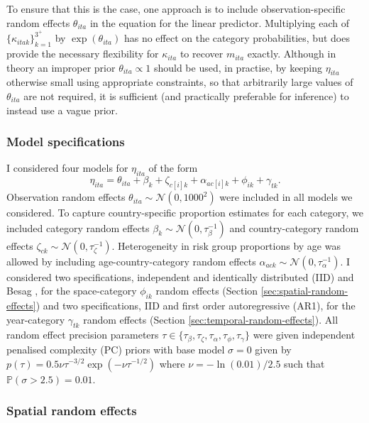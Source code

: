 \documentclass[a4paper, nobind]{templates/ociamthesis}
\begin{document}
To ensure that this is the case, one approach is to include observation-specific random effects \(\theta_{ita}\) in the equation for the linear predictor.
Multiplying each of \(\{\kappa_{itak}\}_{k = 1}^{3^+}\) by \(\exp(\theta_{ita})\) has no effect on the category probabilities, but does provide the necessary flexibility for \(\kappa_{ita}\) to recover \(m_{ita}\) exactly.
Although in theory an improper prior \(\theta_{ita} \propto 1\) should be used, in practise, by keeping \(\eta_{ita}\) otherwise small using appropriate constraints, so that arbitrarily large values of \(\theta_{ita}\) are not required, it is sufficient (and practically preferable for inference) to instead use a vague prior.

\hypertarget{model-specifications}{%
\subsubsection{Model specifications}\label{model-specifications}}

I considered four models for \(\eta_{ita}\) of the form
\[
\eta_{ita} = \theta_{ita} + \beta_k + \zeta_{c[i]k} + \alpha_{ac[i]k} + \phi_{ik} + \gamma_{tk}.
\]
Observation random effects \(\theta_{ita} \sim \mathcal{N}(0, 1000^2)\) were included in all models we considered.
To capture country-specific proportion estimates for each category, we included category random effects \(\beta_k \sim \mathcal{N}(0, \tau_\beta^{-1})\) and country-category random effects \(\zeta_{ck} \sim \mathcal{N}(0, \tau_\zeta^{-1})\).
Heterogeneity in risk group proportions by age was allowed by including age-country-category random effects \(\alpha_{ack} \sim \mathcal{N}(0, \tau_\alpha^{-1})\).
I considered two specifications, independent and identically distributed (IID) and Besag \autocite{besag1991bayesian}, for the space-category \(\phi_{ik}\) random effects (Section \ref{sec:spatial-random-effects}) and two specifications, IID and first order autoregressive (AR1), for the year-category \(\gamma_{tk}\) random effects (Section \ref{sec:temporal-random-effects}).
All random effect precision parameters \(\tau \in \{\tau_\beta, \tau_\zeta, \tau_\alpha, \tau_\phi, \tau_\gamma\}\) were given independent penalised complexity (PC) priors \autocite{simpson2017penalising} with base model \(\sigma = 0\) given by \(p(\tau) = 0.5 \nu \tau^{-3/2} \exp \left( - \nu \tau^{-1/2} \right)\) where \(\nu = - \ln(0.01) / 2.5\) such that \(\mathbb{P}(\sigma > 2.5) = 0.01\).

\hypertarget{spatial-random-effects-1}{%
\subsubsection{Spatial random effects}\label{spatial-random-effects-1}}
\end{document}
